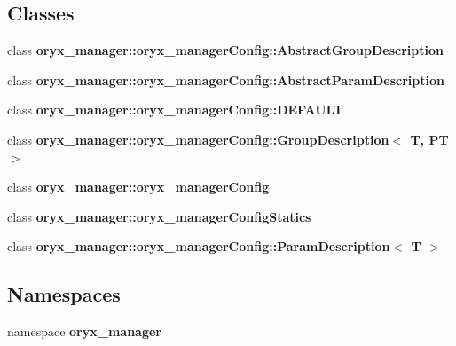 \subsection*{\-Classes}
\begin{DoxyCompactItemize}
\item 
class {\bf oryx\-\_\-manager\-::oryx\-\_\-manager\-Config\-::\-Abstract\-Group\-Description}
\item 
class {\bf oryx\-\_\-manager\-::oryx\-\_\-manager\-Config\-::\-Abstract\-Param\-Description}
\item 
class {\bf oryx\-\_\-manager\-::oryx\-\_\-manager\-Config\-::\-D\-E\-F\-A\-U\-L\-T}
\item 
class {\bf oryx\-\_\-manager\-::oryx\-\_\-manager\-Config\-::\-Group\-Description$<$ T, P\-T $>$}
\item 
class {\bf oryx\-\_\-manager\-::oryx\-\_\-manager\-Config}
\item 
class {\bf oryx\-\_\-manager\-::oryx\-\_\-manager\-Config\-Statics}
\item 
class {\bf oryx\-\_\-manager\-::oryx\-\_\-manager\-Config\-::\-Param\-Description$<$ T $>$}
\end{DoxyCompactItemize}
\subsection*{\-Namespaces}
\begin{DoxyCompactItemize}
\item 
namespace {\bf oryx\-\_\-manager}
\end{DoxyCompactItemize}
